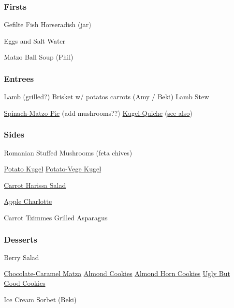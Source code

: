 \begin{centering}
 \subsubsection*{Firsts}
 Gefilte Fish \And Horseradish (jar)

 Eggs and Salt Water

 Matzo Ball Soup (Phil)

 \subsubsection*{Entrees}

 Lamb (grilled?) \blt Brisket w/ potatos \And carrots (Amy / Beki) \blt \href{https://instantpoteats.com/instant-pot-leg-lamb-stew-dates-cinnamon/}{Lamb Stew}

 \hyperref[Spinach Matzo Pie]{Spinach-Matzo Pie} (add mushrooms??) \blt \href{https://www.myjewishlearning.com/the-nosher/quiche-with-veggie-crust-recipe/}{Kugel-Quiche} (\href{https://toriavey.com/toris-kitchen/potato-crusted-spinach-frittata/}{see also})

 \subsubsection*{Sides}
 Romanian Stuffed Mushrooms (feta \And chives)

 \href{https://smittenkitchen.com/2015/12/potato-kugel/}{Potato Kugel} \blt \href{https://www.epicurious.com/recipes/food/views/potato-carrot-and-zucchini-kugel-241904}{Potato-Vege Kugel}

 \hyperref[Carrot Harissa Salad]{Carrot Harissa Salad}

 \hyperref[Apple Matzo Charlotte]{Apple Charlotte}

 Carrot Tzimmes \blt Grilled Asparagus

 \subsubsection*{Desserts}
 Berry Salad

 \href{https://smittenkitchen.com/2009/04/chocolate-caramel-crackers/}{Chocolate-Caramel Matza}
 \blt \href{https://smittenkitchen.com/2009/04/chewy-amaretti-cookies/}{Almond Cookies} \blt \href{https://smittenkitchen.com/2017/04/almond-horn-cookies/}{Almond Horn Cookies} \blt \href{https://smittenkitchen.com/2016/01/ugly-but-good-cookies/}{Ugly But Good Cookies}

 Ice Cream \blt Sorbet (Beki)

\end{centering}
